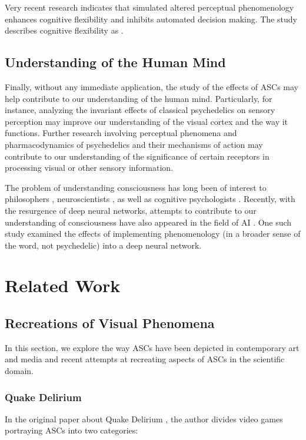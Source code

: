 Very recent research \autocite{rastelli2021simulated} indicates that simulated altered perceptual phenomenology enhances cognitive flexibility and inhibits automated decision making. The study describes cognitive flexibility as .

\subsection{Understanding of the Human Mind}
Finally, without any immediate application, the study of the effects of \acp{ASC} may help contribute to our understanding of the human mind. Particularly, for instance, analyzing the invariant effects of classical psychedelics on sensory perception may improve our understanding of the visual cortex and the way it functions.
Further research involving perceptual phenomena and pharmacodynamics of psychedelics and their mechanisms of action may contribute to our understanding of the significance of certain receptors in processing visual or other sensory information.

The problem of understanding consciousness has long been of interest to philosophers \autocite{block1993consciousness}, neuroscientists \autocite{crick1990towards}, as well as cognitive psychologists \autocite{dehaene2014consciousness}. Recently, with the resurgence of deep neural networks, attempts to contribute to our understanding of consciousness have also appeared in the field of \ac{AI} \autocites{bengio2017consciousness}{reggia2020artificial}. One such study \autocite{bensemann2021effects} examined the effects of implementing phenomenology (in a broader sense of the word, not psychedelic) into a deep neural network.

\section{Related Work}

\subsection{Recreations of Visual Phenomena}
In this section, we explore the way \acp{ASC} have been depicted in contemporary art and media and recent attempts at recreating aspects of \acp{ASC} in the scientific domain.

\subsubsection{Quake Delirium}
In the original paper about Quake Delirium \autocite{weinel2011quake}, the author divides video games portraying \acp{ASC} into two categories:

